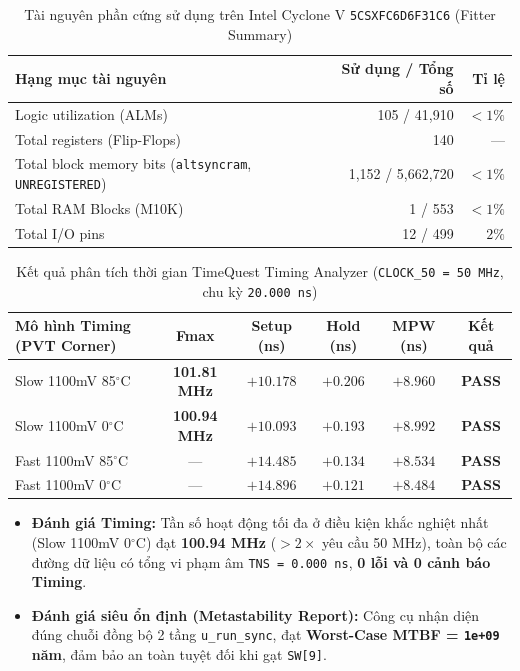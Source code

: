 \documentclass[11pt,a4paper]{article}
\newcommand{\code}[1]{\texttt{\small #1}}
\begin{document}
\begin{table}[H]
  \centering
  \caption{Tài nguyên phần cứng sử dụng trên Intel Cyclone V \code{5CSXFC6D6F31C6} (Fitter Summary)}
  \label{tab:fitter}
  \small
  \renewcommand{\arraystretch}{1.1}
  \begin{tabular}{@{}l r r@{}}
    \toprule
    \textbf{Hạng mục tài nguyên} & \textbf{Sử dụng / Tổng số} & \textbf{Tỉ lệ} \\
    \midrule
    Logic utilization (ALMs) & 105 / 41,910 & $< 1\%$ \\
    Total registers (Flip-Flops) & 140 & --- \\
    Total block memory bits (\code{altsyncram}, \code{UNREGISTERED}) & 1,152 / 5,662,720 & $< 1\%$ \\
    Total RAM Blocks (M10K) & 1 / 553 & $< 1\%$ \\
    Total I/O pins & 12 / 499 & $2\%$ \\
    \bottomrule
  \end{tabular}
\end{table}

\begin{table}[H]
  \centering
  \caption{Kết quả phân tích thời gian TimeQuest Timing Analyzer (\code{CLOCK\_50 = 50 MHz}, chu kỳ \code{20.000 ns})}
  \label{tab:timing}
  \footnotesize
  \setlength{\tabcolsep}{5pt}
  \renewcommand{\arraystretch}{1.15}
  \begin{tabularx}{\linewidth}{@{}X c c c c c@{}}
    \toprule
    \textbf{Mô hình Timing (PVT Corner)} & \textbf{Fmax} & \textbf{Setup (ns)} & \textbf{Hold (ns)} & \textbf{MPW (ns)} & \textbf{Kết quả} \\
    \midrule
    Slow 1100mV 85$^\circ$C & \textbf{101.81 MHz} & $+10.178$ & $+0.206$ & $+8.960$ & \textcolor{passGreen}{\textbf{PASS}} \\
    Slow 1100mV 0$^\circ$C  & \textbf{100.94 MHz} & $+10.093$ & $+0.193$ & $+8.992$ & \textcolor{passGreen}{\textbf{PASS}} \\
    Fast 1100mV 85$^\circ$C & ---                 & $+14.485$ & $+0.134$ & $+8.534$ & \textcolor{passGreen}{\textbf{PASS}} \\
    Fast 1100mV 0$^\circ$C  & ---                 & $+14.896$ & $+0.121$ & $+8.484$ & \textcolor{passGreen}{\textbf{PASS}} \\
    \bottomrule
  \end{tabularx}
\end{table}

\begin{itemize}
  \item \textbf{Đánh giá Timing:} Tần số hoạt động tối đa ở điều kiện khắc nghiệt nhất (Slow 1100mV 0$^\circ$C) đạt \textbf{100.94 MHz} ($> 2\times$ yêu cầu 50 MHz), toàn bộ các đường dữ liệu có tổng vi phạm âm \code{TNS = 0.000 ns}, \textbf{0 lỗi và 0 cảnh báo Timing}.
  \item \textbf{Đánh giá siêu ổn định (Metastability Report):} Công cụ nhận diện đúng chuỗi đồng bộ 2 tầng \code{u\_run\_sync}, đạt \textbf{Worst-Case MTBF = \code{1e+09} năm}, đảm bảo an toàn tuyệt đối khi gạt \code{SW[9]}.
\end{itemize}
\end{document}
